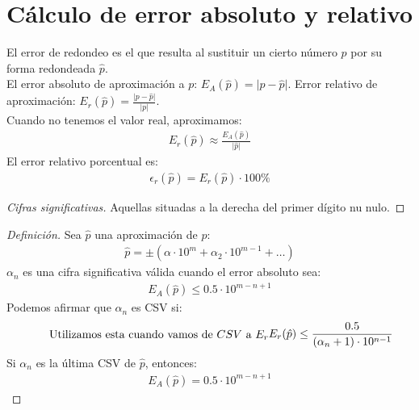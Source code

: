 \documentclass{article}
\begin{document}
\section{Cálculo de error absoluto y relativo}
El error de redondeo es el que resulta al sustituir un cierto número $p$ por su forma
redondeada $\hat{p}$.\\
El error absoluto de aproximación a $p$: $E_{A}(\hat{p}) = \lvert p-\hat{p} \rvert $.
Error relativo de aproximación: $E_{r}(\hat{p}) = \frac{\lvert p-\hat{p} \rvert }{\lvert p \rvert }$.\\
Cuando no tenemos el valor real, aproximamos:
\begin{equation}
    \begin{split}
        E_{r}(\hat{p}) \approx \frac{E_{A}(\hat{p})}{\lvert \hat{p} \rvert }
    \end{split}
\end{equation}
El error relativo porcentual es:
\begin{equation}
    \begin{split}
        \epsilon _{r} ( \hat{p}) = E_{r}(\hat{p})\cdot 100 \%
    \end{split}
\end{equation}
\begin{proof}[Cifras significativas]
    Aquellas situadas a la derecha del primer dígito nu nulo.
\end{proof}
\begin{proof}[Definición]
    Sea $\hat{p}$ una aproximación de $p$:
    \begin{equation}
        \begin{split}
            \hat{p} = \pm (\alpha \cdot 10^{m}+ \alpha _{2} \cdot 10^{m-1}+ \dots)
        \end{split}
    \end{equation}
    $\alpha _{n}$ es una cifra significativa válida cuando el error absoluto sea:
    \begin{equation}
        \begin{split}
            E_{A} (\hat{p}) \leq 0.5\cdot 10^{m-n+1}
        \end{split}
    \end{equation}
    Podemos afirmar que $\alpha_{n}$ es CSV si:
    \begin{equation}\tag*{Utilizamos esta cuando vamos de $CSV$ a $E_{r}$}
        \begin{split}
            E_{r}(\hat{p}) \leq \frac{0.5}{(\alpha _{n} +1)\cdot 10^{n-1}}
        \end{split}
    \end{equation}
    Si $\alpha _{n}$ es la última CSV de $\hat{p}$, entonces:
    \begin{equation}
        \begin{split}
            E_{A}(\hat{p}) = 0.5\cdot 10^{m-n+1}
        \end{split}
    \end{equation}
\end{proof}
\end{document}
